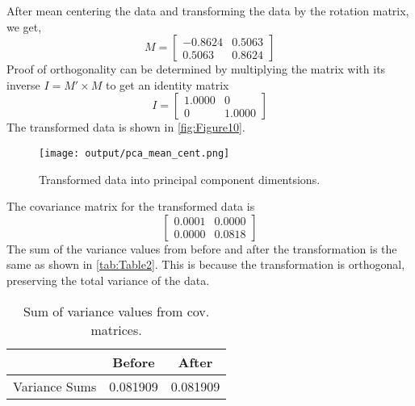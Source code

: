 \documentclass[12pt]{report}
\begin{document}
\begin{enumerate}
    After mean centering the data and transforming the data by the rotation matrix, we get,
    $$
    M = 
    \begin{bmatrix}
    -0.8624 &  0.5063 \\
    0.5063  &  0.8624
    \end{bmatrix}
    $$
    Proof of orthogonality can be determined by multiplying the matrix with its inverse $I = M' \times M$ to get an 
    identity matrix
    $$
    I = 
    \begin{bmatrix}
    1.0000  &      0 \\
    0       & 1.0000
    \end{bmatrix}
    $$
    The transformed data is shown in \autoref{fig:Figure10}. 
    
    \begin{figure}[ht!]
        \texttt{[image: output/pca\_mean\_cent.png]}
        \centering
        \caption{Transformed data into principal component dimentsions.}
        \label{fig:Figure10}
    \end{figure}

    The covariance matrix for the transformed data is 
    $$
    \begin{bmatrix}
    0.0001  &  0.0000 \\
    0.0000  &  0.0818
    \end{bmatrix}
    $$
    The sum of the variance values from before and after the transformation is the same as shown 
    in \autoref{tab:Table2}. This is because the transformation is orthogonal, preserving the total 
    variance of the data.

    \begin{table}[h!]
    \begin{center}
    \begin{tabular}{ c | c | c } 
        \hline
         & Before & After \\ 
        \hline \hline
        Variance Sums & 0.081909 & 0.081909 \\ 
        \hline
    \end{tabular}
    \caption{Sum of variance values from cov. matrices.}
    \label{tab:Table2}
    \end{center}
    \end{table}

\end{enumerate}
\end{document}
